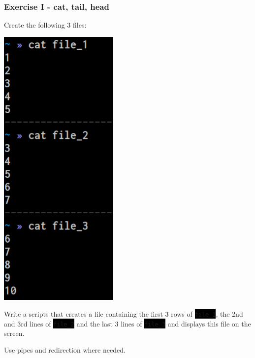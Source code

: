 \documentclass[unknownkeysallowed, 10pt, a4 paper, handout]{beamer}
\newcommand{\code}[1]{\colorbox{black}{\color{green}\texttt{#1}}}
\newcommand{\sidebyside}[5]{
  \begin{minipage}{#1\textwidth}
    #2
  \end{minipage} #3 \begin{minipage}{#4\textwidth}
    #5
  \end{minipage}
}
\begin{document}
\begin{frame}
  \begin{center}
    \frametitle{Exercise I - cat, tail, head}

    \sidebyside{0.40}{
      Create the following 3 files:
    }{\hfill}{0.50}{
      \begin{center}
        \includegraphics[width=0.44\textwidth]{pics/ex_1.png}
      \end{center}
    }

    Write a scripts that creates a file containing the first 3 rows of
    \code{file\_1}, the 2nd and 3rd lines of \code{file\_2} and the last 3
    lines of \code{file\_3} and displays this file on the screen.

    Use pipes and redirection where needed.
  \end{center}
\end{frame}
\end{document}
